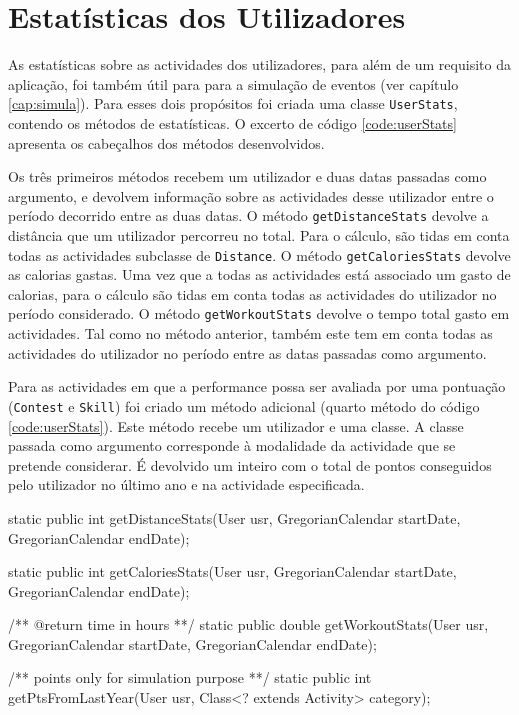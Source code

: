\documentclass[a4paper,10pt]{report}
\begin{document}
\chapter{Estatísticas dos Utilizadores}
\label{cap:estatisticas}
As estatísticas sobre as actividades dos utilizadores, para além de um requisito da aplicação, 
foi também útil para para a simulação de eventos (ver capítulo \ref{cap:simula}). 
Para esses dois propósitos foi criada uma classe \verb!UserStats!, contendo os métodos de estatísticas. 
O excerto de código \ref{code:userStats} apresenta os cabeçalhos dos métodos desenvolvidos.

Os três primeiros métodos recebem um utilizador e duas datas passadas como argumento, e devolvem informação sobre as actividades desse utilizador 
entre o período decorrido entre as duas datas.
O método \verb!getDistanceStats! devolve a distância que um utilizador percorreu no total. 
Para o cálculo, são tidas em conta todas as actividades subclasse de \verb!Distance!.
O método \verb!getCaloriesStats! devolve as calorias gastas. 
Uma vez que a todas as actividades está associado um gasto de calorias, para o cálculo são tidas em conta todas 
as actividades do utilizador no período considerado.
O método \verb!getWorkoutStats! devolve o tempo total gasto em actividades. 
Tal como no método anterior, também este tem em conta todas as actividades do utilizador no período entre as datas passadas como argumento.

Para as actividades em que a performance possa ser avaliada por uma pontuação (\verb!Contest! e \verb!Skill!) foi criado um método adicional 
(quarto método do código \ref{code:userStats}).
Este método recebe um utilizador e uma classe. A classe passada como argumento corresponde à modalidade da actividade que se pretende considerar. 
É devolvido um inteiro com o total de pontos conseguidos pelo utilizador no último ano e na actividade especificada.

\begin{code}[caption=Métodos para cálculo de estatísticas (src/core/UserStats)., label=code:userStats]
static public int getDistanceStats(User usr, GregorianCalendar startDate, GregorianCalendar endDate);

static public int getCaloriesStats(User usr, GregorianCalendar startDate, GregorianCalendar endDate);

/** @return time in hours **/
static public double getWorkoutStats(User usr, GregorianCalendar startDate, GregorianCalendar endDate);
  
/** points only for simulation purpose **/
static public int getPtsFromLastYear(User usr, Class<? extends Activity> category);
\end{code}
\end{document}
